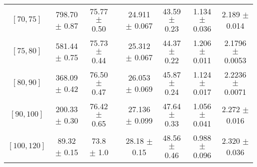 \begin{tabular}{c||c|c|c|c|c|c|c}
$[70, 75]$ & 798.70 $\pm$ 0.87 & 75.77 $\pm$ 0.50 &  & 24.911 $\pm$ 0.067 & 43.59 $\pm$ 0.23 & 1.134 $\pm$ 0.036 & 2.189 $\pm$ 0.014\\
$[75, 80]$ & 581.44 $\pm$ 0.75 & 75.73 $\pm$ 0.44 &  & 25.312 $\pm$ 0.067 & 44.37 $\pm$ 0.22 & 1.206 $\pm$ 0.011 & 2.1796 $\pm$ 0.0053\\
$[80, 90]$ & 368.09 $\pm$ 0.42 & 76.50 $\pm$ 0.47 &  & 26.053 $\pm$ 0.069 & 45.87 $\pm$ 0.24 & 1.124 $\pm$ 0.017 & 2.2236 $\pm$ 0.0071\\
$[90, 100]$ & 200.33 $\pm$ 0.30 & 76.42 $\pm$ 0.65 &  & 27.136 $\pm$ 0.099 & 47.64 $\pm$ 0.33 & 1.056 $\pm$ 0.041 & 2.272 $\pm$ 0.016\\
$[100, 120]$ & 89.32 $\pm$ 0.15 & 73.8 $\pm$ 1.0 &  & 28.18 $\pm$ 0.15 & 48.56 $\pm$ 0.46 & 0.988 $\pm$ 0.096 & 2.320 $\pm$ 0.036\\
\end{tabular}

